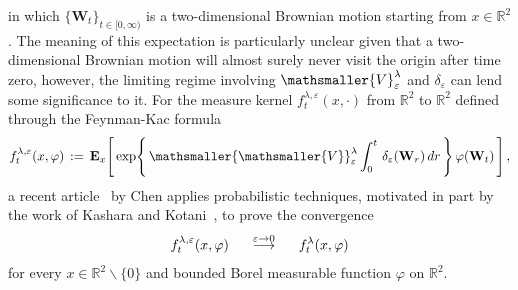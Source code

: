 \documentclass[10pt]{article}
\def\stackrel#1#2{\mathrel{\mathop{#2}\limits^{#1}}}
\numberwithin{equation}{section}
\theoremstyle{definition}
\newcommand{\R}{{\mathbb R}}
\newcommand{\vsm}{{\mathsmaller{\mathsmaller{V}}}}
\begin{document}
in which  $\{\mathbf{W}_t\}_{t\in [0,\infty)}$ is a two-dimensional Brownian motion starting from $x\in \R^2$. The meaning of this expectation is particularly  unclear given that a two-dimensional Brownian motion will almost surely never visit the origin after time zero, however, the limiting regime involving  $\mathsmaller{V}^{\lambda}_{\varepsilon}$ and $\delta_{\varepsilon}$ can lend some significance to it.  For the measure kernel $f_{t }^{\lambda,\varepsilon}(x,\cdot)$ from $\R^2$ to $\R^2$ defined through the Feynman-Kac formula
\begin{align}\label{Chen}
f_{t }^{\lambda,\varepsilon}(x,\varphi)\,:=\,\mathbf{E}_x\Bigg[ \,\textup{exp}\Bigg\{ \,\vsm^{\lambda}_{\varepsilon}\int_0^t \,\delta_{\varepsilon}(\mathbf{W}_r)\,dr\,\Bigg\}\, \varphi(\mathbf{W}_t)   \,\Bigg]\,,
\end{align}
a recent article~\cite{Chen} by Chen  applies probabilistic techniques, motivated in part by the work of Kashara and Kotani~\cite{Kashara3}, to prove the convergence
\begin{align}\label{ConvKer}
f_{t }^{\lambda,\varepsilon}(x,\varphi)\hspace{.5cm}\stackrel{\varepsilon\rightarrow 0}{\longrightarrow} \hspace{.5cm}  f_{t }^{\lambda}(x,\varphi)
\end{align}
for every
  $x\in \R^2\backslash \{0\}$ and bounded Borel measurable  function $\varphi$ on $\R^2$.
\end{document}
